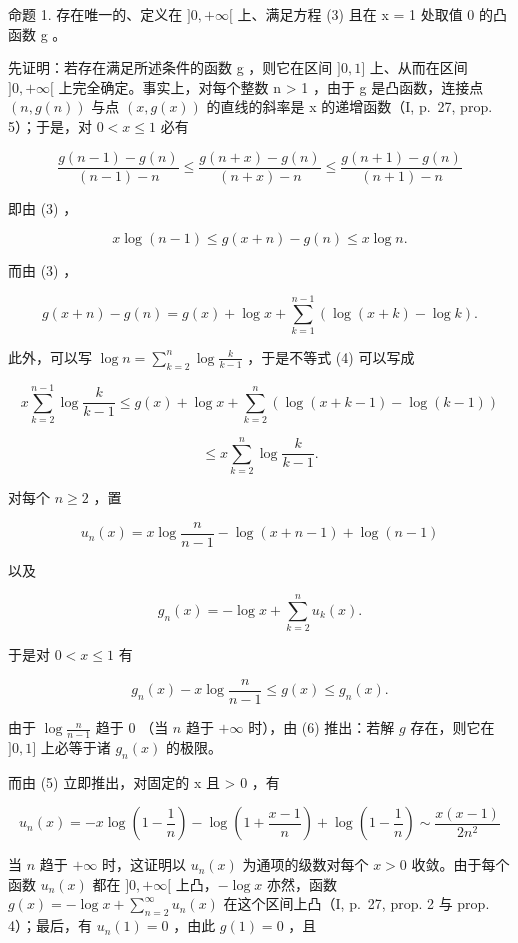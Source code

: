 命题 1. 存在唯一的、定义在 \(]0, +\infty[\) 上、满足方程 (3) 且在 x = 1 处取值 0 的凸函数 g 。

先证明：若存在满足所述条件的函数 g ，则它在区间 \(]0, 1]\) 上、从而在区间 \(]0, +\infty[\) 上完全确定。事实上，对每个整数 n \textgreater{} 1 ，由于 g 是凸函数，连接点 \((n, g(n))\) 与点 \((x, g(x))\) 的直线的斜率是 x 的递增函数（I, p.~27, prop. 5）；于是，对 \(0 < x \leqslant 1\) 必有

\[
\frac {g (n - 1) - g (n)}{(n - 1) - n} \leqslant \frac {g (n + x) - g (n)}{(n + x) - n} \leqslant \frac {g (n + 1) - g (n)}{(n + 1) - n}
\]

即由 (3) ，

\[
x \log (n - 1) \leqslant g (x + n) - g (n) \leqslant x \log n.\tag{4}
\]

而由 (3) ，

\[
g (x + n) - g (n) = g (x) + \log x + \sum_ {k = 1} ^ {n - 1} (\log (x + k) - \log k).
\]

此外，可以写 \(\log n = \sum_{k=2}^{n} \log \frac{k}{k-1}\) ，于是不等式 (4) 可以写成

\[
x \sum_ {k = 2} ^ {n - 1} \log \frac {k}{k - 1} \leqslant g (x) + \log x + \sum_ {k = 2} ^ {n} (\log (x + k - 1) - \log (k - 1))
\]

\[
\leqslant x \sum_ {k = 2} ^ {n} \log \frac {k}{k - 1}.
\]

对每个 \(n \geqslant 2\) ，置

\[
u _ {n} (x) = x \log {\frac {n}{n - 1}} - \log (x + n - 1) + \log (n - 1)\tag{5}
\]

以及

\[
g _ {n} (x) = - \log x + \sum_ {k = 2} ^ {n} u _ {k} (x).
\]

于是对 \(0 < x \leqslant 1\) 有

\[
g _ {n} (x) - x \log \frac {n}{n - 1} \leqslant g (x) \leqslant g _ {n} (x).\tag{6}
\]

由于 \(\log \frac{n}{n - 1}\) 趋于 0 （当 \(n\) 趋于 \(+\infty\) 时），由 (6) 推出：若解 \(g\) 存在，则它在 \(]0, 1]\) 上必等于诸 \(g_n(x)\) 的极限。

而由 (5) 立即推出，对固定的 x 且 \textgreater{} 0 ，有

\[
u _ {n} (x) = - x \log \left(1 - \frac {1}{n}\right) - \log \left(1 + \frac {x - 1}{n}\right) + \log \left(1 - \frac {1}{n}\right) \sim \frac {x (x - 1)}{2 n ^ {2}}
\]

当 \(n\) 趋于 \(+\infty\) 时，这证明以 \(u_{n}(x)\) 为通项的级数对每个 \(x > 0\) 收敛。由于每个函数 \(u_{n}(x)\) 都在 \(]0, +\infty[\) 上凸，\(-\log x\) 亦然，函数 \(g(x) = -\log x + \sum_{n=2}^{\infty} u_{n}(x)\) 在这个区间上凸（I, p.~27, prop. 2 与 prop. 4）；最后，有 \(u_{n}(1) = 0\) ，由此 \(g(1) = 0\) ，且

